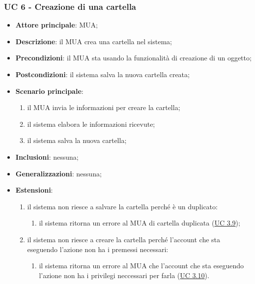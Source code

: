 \subsubsection{UC 6 - Creazione di una cartella} \label{sec:UC6}
    \begin{itemize}
        \item \textbf{Attore principale}: MUA;
        \item \textbf{Descrizione}: il MUA crea una cartella nel sistema;
        \item \textbf{Precondizioni}: il MUA sta usando la funzionalità di creazione di un oggetto;
        \item \textbf{Postcondizioni}: il sistema salva la nuova cartella creata;
        \item \textbf{Scenario principale}:
            \begin{enumerate}
                \item il MUA invia le informazioni per creare la cartella;
                \item il sistema elabora le informazioni ricevute;
                \item il sistema salva la nuova cartella;
            \end{enumerate}
        \item \textbf{Inclusioni}: nessuna;
        \item \textbf{Generalizzazioni}: nessuna;
        \item \textbf{Estensioni}:
            \begin{enumerate}[label=\alph*.]
                \item il sistema non riesce a salvare la cartella perché è un duplicato:
                \begin{enumerate}[label=\arabic*.]
                    \item il sistema ritorna un errore al MUA di cartella duplicata (\hyperref[sec:UC3.9]{UC 3.9});
                \end{enumerate}
                \item il sistema non riesce a creare la cartella perché l'account che sta eseguendo l'azione non ha i premessi necessari:
                \begin{enumerate}[label=\arabic*.]
                    \item il sistema ritorna un errore al MUA che l'account che sta eseguendo l'azione non ha i privilegi neccessari per farla (\hyperref[sec:UC3.10]{UC 3.10}).
                \end{enumerate}
            \end{enumerate}
    \end{itemize}